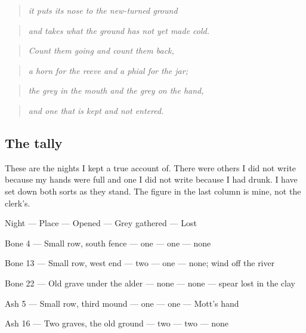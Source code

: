 \documentclass{design/chronicle}
\begin{document}
\begin{quote}\itshape it puts its nose to the new-turned ground\end{quote}

\begin{quote}\itshape and takes what the ground has not yet made cold.\end{quote}

\begin{quote}\itshape \end{quote}

\begin{quote}\itshape Count them going and count them back,\end{quote}

\begin{quote}\itshape a horn for the reeve and a phial for the jar;\end{quote}

\begin{quote}\itshape the grey in the mouth and the grey on the hand,\end{quote}

\begin{quote}\itshape and one that is kept and not entered.\end{quote}

\subsection*{The tally}

These are the nights I kept a true account of. There were others I did not write because my hands were full and one I did not write because I had drunk. I have set down both sorts as they stand. The figure in the last column is mine, not the clerk’s.

Night — Place — Opened — Grey gathered — Lost\par

Bone 4 — Small row, south fence — one — one — none\par

Bone 13 — Small row, west end — two — one — none; wind off the river\par

Bone 22 — Old grave under the alder — none — none — spear lost in the clay\par

Ash 5 — Small row, third mound — one — one — Mott’s hand\par

Ash 16 — Two graves, the old ground — two — two — none\par
\end{document}
